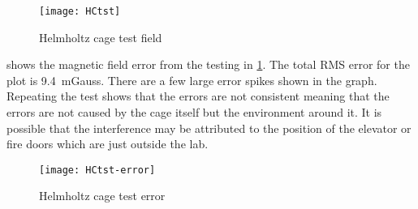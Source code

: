 \begin{figure}[htb]
    \centering
    \texttt{[image: HCtst]}
    \caption{Helmholtz cage test field}
    \label{fig:hc-tst}
\end{figure}

 shows the magnetic field error from the testing in \cref{fig:hc-tst}. The total RMS error for the plot is 9.4~mGauss. There are a few large error spikes shown in the graph. Repeating the test shows that the errors are not consistent meaning that the errors are not caused by the cage itself but the environment around it.  It is possible that the interference may be attributed to the position of the elevator or fire doors which are just outside the lab.

\begin{figure}[htb]
    \centering
    \texttt{[image: HCtst-error]}
    \caption{Helmholtz cage test error}
    \label{fig:hc-tst-err}
\end{figure}

